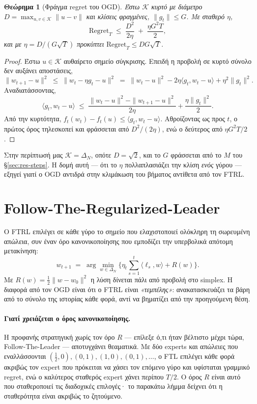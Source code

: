 \documentclass[12pt,a4paper,oneside]{report}
\newcommand{\en}[1]{\textenglish{#1}}
\renewcommand{\_}{\oldunderscore\allowbreak}
\theoremstyle{definition}
\theoremstyle{plain}
\newtheorem{theorem}{Θεώρημα}[chapter]
\theoremstyle{remark}
\begin{document}
\begin{theorem}[Φράγμα regret του OGD]
Έστω $\mathcal{K}$ κυρτό με διάμετρο $D = \max_{u,v\in\mathcal{K}}\|u-v\|$ και κλίσεις
φραγμένες, $\|g_t\| \leq G$. Με σταθερό $\eta$,
\[
\mathrm{Regret}_T \;\leq\; \frac{D^2}{2\eta} \;+\; \frac{\eta G^2 T}{2},
\]
και με $\eta = D/(G\sqrt{T})$ προκύπτει $\mathrm{Regret}_T \leq D G \sqrt{T}$.
\end{theorem}

\begin{proof}
Έστω $u \in \mathcal{K}$ αυθαίρετο σημείο σύγκρισης. Επειδή η προβολή σε κυρτό σύνολο δεν
αυξάνει αποστάσεις,
\[
\|w_{t+1}-u\|^2 \;\leq\; \|w_t - \eta g_t - u\|^2
\;=\; \|w_t-u\|^2 - 2\eta \langle g_t, w_t-u\rangle + \eta^2\|g_t\|^2 .
\]
Αναδιατάσσοντας,
\[
\langle g_t, w_t - u\rangle \;\leq\; \frac{\|w_t-u\|^2 - \|w_{t+1}-u\|^2}{2\eta}
+ \frac{\eta \|g_t\|^2}{2}.
\]
Από την κυρτότητα, $f_t(w_t) - f_t(u) \leq \langle g_t, w_t-u\rangle$. Αθροίζοντας ως προς
$t$, ο πρώτος όρος τηλεσκοπεί και φράσσεται από $D^2/(2\eta)$, ενώ ο δεύτερος από
$\eta G^2 T/2$.
\end{proof}

Στην περίπτωσή μας $\mathcal{K}=\Delta_N$, οπότε $D=\sqrt{2}$, και το $G$ φράσσεται από το
$M$ του \S\ref{sec:res-steps}. Η δομή αυτή --- ότι το $\eta$ πολλαπλασιάζει την κλίση
\emph{ενός} γύρου --- εξηγεί γιατί ο OGD αντιδρά στην κλιμάκωση του βήματος αντίθετα από τον
FTRL.

\section{Follow-The-Regularized-Leader}

Ο FTRL επιλέγει σε κάθε γύρο το σημείο που ελαχιστοποιεί ολόκληρη τη σωρευμένη απώλεια, συν
έναν όρο κανονικοποίησης που εμποδίζει την υπερβολικά απότομη μετακίνηση:
\[
w_{t+1} \;=\; \arg\min_{w \in \Delta_N} \Big\{ \eta_t \sum_{s=1}^{t} \langle \ell_s, w \rangle
+ R(w) \Big\}.
\]
Με $R(w) = \tfrac12\|w - w_0\|^2$ η λύση δίνεται πάλι από προβολή στο simplex. Η διαφορά από
τον OGD είναι ότι ο FTRL είναι \emph{«τεμπέλης»}: ανακατασκευάζει τα βάρη από το σύνολο της
ιστορίας κάθε φορά, αντί να βηματίζει από την προηγούμενη θέση.

\paragraph{Γιατί χρειάζεται ο όρος κανονικοποίησης.} Η προφανής στρατηγική χωρίς τον όρο
$R$ --- επίλεξε ό,τι ήταν βέλτιστο μέχρι τώρα, \en{Follow-The-Leader} --- αποτυγχάνει
θεαματικά. Με δύο experts και απώλειες που εναλλάσσονται $(\tfrac12,0),(0,1),(1,0),(0,1),
\dots$, ο FTL επιλέγει κάθε φορά ακριβώς τον expert που πρόκειται να χάσει τον επόμενο γύρο
και υφίσταται γραμμικό regret, ενώ ο καλύτερος σταθερός expert χάνει περίπου $T/2$. Ο όρος
$R$ είναι αυτό που σταθεροποιεί τις διαδοχικές επιλογές· το παρακάτω λήμμα δείχνει ότι η
σταθερότητα είναι ακριβώς το ζητούμενο.
\end{document}
